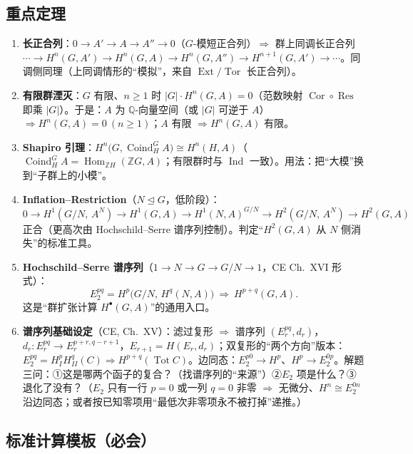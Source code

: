 \documentclass[12pt,a4paper]{ctexart}
\DeclareMathOperator{\Hom}{Hom}
\DeclareMathOperator{\Ext}{Ext}
\DeclareMathOperator{\Tor}{Tor}
\DeclareMathOperator{\Tot}{Tot}
\newcommand{\keypoint}{\text{\textbf{\ensuremath{\bigstar}}\;}}
\newcommand{\method}{\text{\textbf{方法}}\;}
\begin{document}
\subsection{\keypoint 重点定理}

\begin{enumerate}
  \item \textbf{长正合列}：$0\to A'\to A\to A''\to0$（$G$-模短正合列）$\Rightarrow$ 群上同调长正合列 $\cdots\to H^n(G,A')\to H^n(G,A)\to H^n(G,A'')\to H^{n+1}(G,A')\to\cdots$。同调侧同理（上同调情形的“模拟”，来自 $\Ext/\Tor$ 长正合列）。
  \item \textbf{有限群湮灭}：$G$ 有限、$n\ge1$ 时 $|G|\cdot H^n(G,A)=0$（范数映射 $\operatorname{Cor}\circ\operatorname{Res}$ 即乘 $|G|$）。\keypoint 于是：$A$ 为 $\mathbb Q$-向量空间（或 $|G|$ 可逆于 $A$）$\Rightarrow H^n(G,A)=0\ (n\ge1)$；$A$ 有限 $\Rightarrow H^n(G,A)$ 有限。
  \item \textbf{Shapiro 引理}：$H^n\bigl(G,\operatorname{Coind}_H^G A\bigr)\cong H^n(H,A)$（$\operatorname{Coind}_H^G A=\Hom_{\mathbb ZH}(\mathbb ZG,A)$；有限群时与 $\operatorname{Ind}$ 一致）。\keypoint 用法：把“大模”换到“子群上的小模”。
  \item \textbf{Inflation--Restriction}（$N\trianglelefteq G$，低阶段）：
  \[
    0\to H^1(G/N,\,A^N)\to H^1(G,A)\to H^1(N,A)^{G/N}\to H^2(G/N,\,A^N)\to H^2(G,A)
  \]
  正合（更高次由 Hochschild--Serre 谱序列控制）。\keypoint 判定“$H^2(G,A)$ 从 $N$ 侧消失”的标准工具。
  \item \textbf{Hochschild--Serre 谱序列}（$1\to N\to G\to G/N\to1$，CE Ch.~XVI 形式）：
  \[
    E_2^{pq}=H^p\bigl(G/N,\,H^q(N,A)\bigr)\ \Longrightarrow\ H^{p+q}(G,A).
  \]
  \keypoint 这是“群扩张计算 $H^\bullet(G,A)$”的通用入口。
  \item \textbf{谱序列基础设定}（CE, Ch.~XV）：滤过复形 $\Rightarrow$ 谱序列 $(E_r^{pq},d_r)$，$d_r\colon E_r^{pq}\to E_r^{p+r,q-r+1}$，$E_{r+1}=H(E_r,d_r)$；双复形的“两个方向”版本：$E_2^{pq}=H^p_I H^q_{II}(C)\Rightarrow H^{p+q}(\Tot C)$。边同态：$E_2^{p0}\to H^p$、$H^p\to E_2^{0p}$。\keypoint 解题三问：①这是哪两个函子的复合？（找谱序列的“来源”）②$E_2$ 项是什么？③退化了没有？（$E_2$ 只有一行 $p=0$ 或一列 $q=0$ 非零 $\Rightarrow$ 无微分、$H^n\cong E_2^{0n}$ 沿边同态；或者按已知零项用“最低次非零项永不被打掉”递推。）
\end{enumerate}

\subsection{\method 标准计算模板（必会）}
\end{document}
